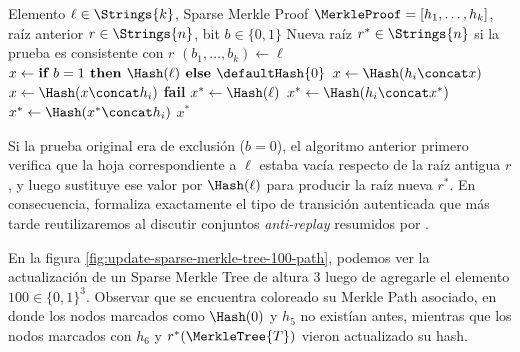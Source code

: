 \begin{algorithm}[ht]
	\caption{Actualización autenticada de la raíz de un Sparse Merkle Tree}
	\label{alg:update-smt-root-from-proof}
	\begin{algorithmic}[1]
		\Require Elemento $\ell \in \Strings{k}$, Sparse Merkle Proof $\MerkleProof = [h_1, \ldots, h_k]$, raíz anterior $r \in \Strings{n}$, bit $b \in \{0,1\}$
		\Ensure Nueva raíz $r^* \in \Strings{n}$ si la prueba es consistente con $r$
		\State $(b_1, \ldots, b_k) \gets \ell$ 
		\State $x \gets \textbf{if } b = 1 \textbf{ then } \Hash(\ell) \textbf{ else } \defaultHash{0}$
				\State $x \gets \Hash(h_i \concat x)$
			\Else
				\State $x \gets \Hash(x \concat h_i)$
			\EndIf
		\EndFor
			\State \Return \textbf{fail}
		\EndIf
		\State $x^* \gets \Hash(\ell)$
				\State $x^* \gets \Hash(h_i \concat x^*)$
			\Else
				\State $x^* \gets \Hash(x^* \concat h_i)$
			\EndIf
		\EndFor
		\State \Return $x^*$
	\end{algorithmic}
\end{algorithm}

Si la prueba original era de exclusión ($b = 0$), el algoritmo anterior primero verifica que la hoja correspondiente a $\ell$ estaba vacía respecto de la raíz antigua $r$, y luego sustituye ese valor por $\Hash(\ell)$ para producir la raíz nueva $r^*$. En consecuencia, formaliza exactamente el tipo de transición autenticada que más tarde reutilizaremos al discutir conjuntos \textit{anti-replay} resumidos por \SMT.

En la figura \ref{fig:update-sparse-merkle-tree-100-path}, podemos ver la actualización de un Sparse Merkle Tree de altura $3$ luego de agregarle el elemento $100 \in \{0,1\}^3$. Observar que se encuentra coloreado su Merkle Path asociado, en donde los nodos marcados como $\Hash(0)$ y $h_5$ no existían antes, mientras que los nodos marcados con $h_6$ y $r^*(\MerkleTree{T})$ vieron actualizado su hash.

